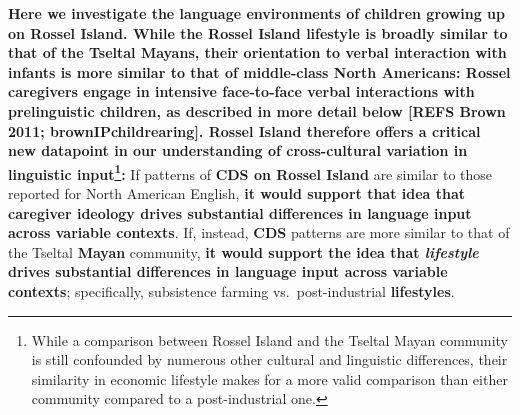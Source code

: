 \documentclass[,man,floatsintext]{apa6}
\let\rmarkdownfootnote\footnote%
\def\footnote{\protect\rmarkdownfootnote}
\begin{document}
\textbf{Here we investigate the language environments of children
growing up on Rossel Island. While the Rossel Island lifestyle is
broadly similar to that of the Tseltal Mayans, their orientation to
verbal interaction with infants is more similar to that of middle-class
North Americans: Rossel caregivers engage in intensive face-to-face
verbal interactions with prelinguistic children, as described in more
detail below {[}REFS Brown 2011; brownIPchildrearing{]}. Rossel Island
therefore offers a critical new datapoint in our understanding of
cross-cultural variation in linguistic input\footnote{While a comparison
  between Rossel Island and the Tseltal Mayan community is still
  confounded by numerous other cultural and linguistic differences,
  their similarity in economic lifestyle makes for a more valid
  comparison than either community compared to a post-industrial one.}:}
If patterns of \textbf{CDS on Rossel Island} are similar to those
reported for North American English, \textbf{it would support that idea
that caregiver ideology drives substantial differences in language input
across variable contexts}. If, instead, \textbf{CDS} patterns are more
similar to that of the Tseltal \textbf{Mayan} community, \textbf{it
would support the idea that \emph{lifestyle} drives substantial
differences in language input across variable contexts}; specifically,
subsistence farming vs.~post-industrial \textbf{lifestyles}.
\end{document}
